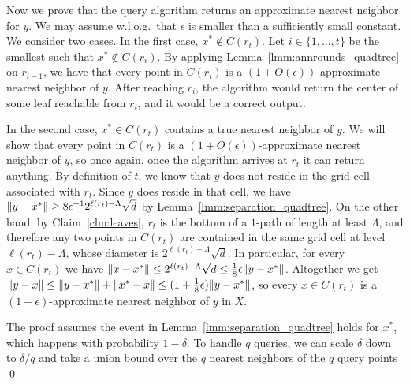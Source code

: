 Now we prove that the query algorithm returns an approximate nearest neighbor for $y$.
We may assume w.l.o.g.~that $\epsilon$ is smaller than a sufficiently small constant.
We consider two cases. In the first case, $x^*\notin C(r_t)$.
Let $i\in\{1,\ldots,t\}$ be the smallest such that $x^*\notin C(r_i)$.
By applying Lemma~\ref{lmm:annrounds_quadtree} on $r_{i-1}$, we have that every point in $C(r_i)$ is a $(1+O(\epsilon))$-approximate nearest neighbor of $y$. After reaching $r_i$, the algorithm would return the center of some leaf reachable from $r_i$, and it would be a correct output.

In the second case, $x^*\in C(r_t)$ contains a true nearest neighbor of $y$. We will show that every point in $C(r_t)$ is a $(1+O(\epsilon))$-approximate nearest neighbor of $y$, so once again, once the algorithm arrives at $r_t$ it can return anything.
By definition of $t$, we know that $y$ does not reside in the grid cell associated with $r_t$. Since $y$ does reside in that cell, we have $\lVert y-x^*\rVert\geq8\epsilon^{-1}2^{\ell(r_t)-\Lambda}\sqrt{d}$ by Lemma~\ref{lmm:separation_quadtree}. On the other hand, by Claim~\ref{clm:leaves}, $r_t$ is the bottom of a $1$-path of length at least $\Lambda$, and therefore any two points in $C(r_t)$ are contained in the same grid cell at level $\ell(r_t)-\Lambda$, whose diameter is $2^{\ell(r_t)-\Lambda}\sqrt{d}$. In particular, for every $x\in C(r_t)$ we have $\lVert x-x^*\rVert\leq2^{\ell(r_t)-\Lambda}\sqrt{d}\leq\frac{1}{8}\epsilon\lVert y-x^*\rVert$. Altogether we get $\lVert y-x\rVert \leq \lVert y-x^*\rVert + \lVert x^*-x\rVert \leq (1+\frac{1}{8}\epsilon)\lVert y-x^*\rVert$, so every $x\in C(r_t)$ is a $(1+\epsilon)$-approximate nearest neighbor of $y$ in $X$.

The proof assumes the event in Lemma~\ref{lmm:separation_quadtree} holds for $x^*$, which happens with probability $1-\delta$. To handle $q$ queries, we can scale $\delta$ down to $\delta/q$ and take a union bound over the $q$ nearest neighbors of the $q$ query points \qed

